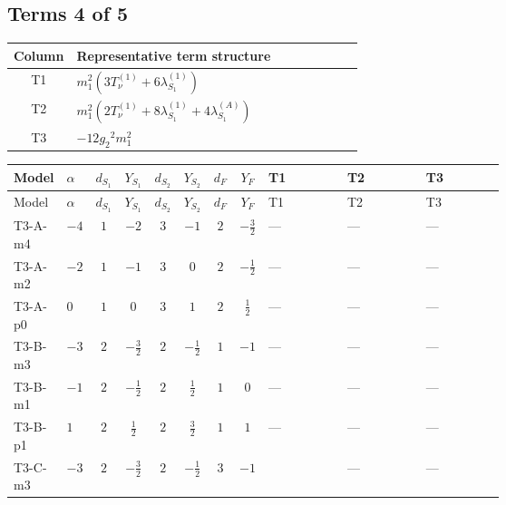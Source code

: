 \documentclass[8pt]{article}
\begin{document}
\begin{landscape}
\subsection*{Terms 4 of 5}
\begin{center}
\begin{tabular}{@{}c >{\raggedright\arraybackslash}p{0.82\linewidth}@{}}
\toprule
Column & Representative term structure \\
\midrule
T1 & \(\displaystyle {m_1^2} (3 T_{\nu}^{(1)}+6 {\lambda_{S_1}^{(1)}})\) \\
\midrule
T2 & \(\displaystyle {m_1^2} (2 T_{\nu}^{(1)}+8 {\lambda_{S_1}^{(1)}}+4 {\lambda_{S_1}^{(A)}})\) \\
\midrule
T3 & \(\displaystyle -12 {g_2}^2 {m_1^2}\) \\
\midrule
\bottomrule
\end{tabular}
\end{center}
\smallskip
\tiny
\begin{longtable}{@{}llcccccc >{\raggedright\arraybackslash}p{0.21\linewidth} >{\raggedright\arraybackslash}p{0.21\linewidth} >{\raggedright\arraybackslash}p{0.21\linewidth}@{}}
\toprule
Model & $\alpha$ & $d_{S_1}$ & $Y_{S_1}$ & $d_{S_2}$ & $Y_{S_2}$ & $d_F$ & $Y_F$ & T1 & T2 & T3 \\
\midrule
\endfirsthead
\toprule
Model & $\alpha$ & $d_{S_1}$ & $Y_{S_1}$ & $d_{S_2}$ & $Y_{S_2}$ & $d_F$ & $Y_F$ & T1 & T2 & T3 \\
\midrule
\endhead
T3-A-m4 & $-4$ & $1$ & $-2$ & $3$ & $-1$ & $2$ & $-\frac{3}{2}$ & --- & --- & --- \\
\midrule
T3-A-m2 & $-2$ & $1$ & $-1$ & $3$ & $0$ & $2$ & $-\frac{1}{2}$ & --- & --- & --- \\
\midrule
T3-A-p0 & $0$ & $1$ & $0$ & $3$ & $1$ & $2$ & $\frac{1}{2}$ & --- & --- & --- \\
\midrule
T3-B-m3 & $-3$ & $2$ & $-\frac{3}{2}$ & $2$ & $-\frac{1}{2}$ & $1$ & $-1$ & --- & --- & --- \\
\midrule
T3-B-m1 & $-1$ & $2$ & $-\frac{1}{2}$ & $2$ & $\frac{1}{2}$ & $1$ & $0$ & --- & --- & --- \\
\midrule
T3-B-p1 & $1$ & $2$ & $\frac{1}{2}$ & $2$ & $\frac{3}{2}$ & $1$ & $1$ & --- & --- & --- \\
\midrule
T3-C-m3 & $-3$ & $2$ & $-\frac{3}{2}$ & $2$ & $-\frac{1}{2}$ & $3$ & $-1$ & \scriptsize\adjustbox{max width=\linewidth}{$\begin{gathered} {m_1^2} (3 T_{\nu}^{(1)}+6 {\lambda_{S_1}^{(1)}})\end{gathered}$} & --- & --- \\

\end{longtable}
\end{landscape}
\end{document}

